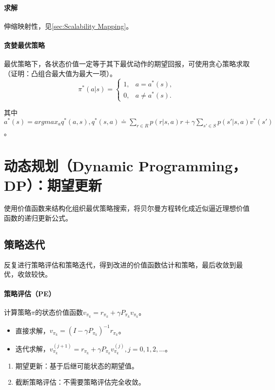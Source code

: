 \documentclass[
12pt, %
a4paper, 
oneside, %
headinclude,footinclude, %
]{scrartcl}
\begin{document}
\paragraph{求解}
伸缩映射性，见\ref{sec:Scalability Mapping}。\label{sec:Scalability Mapping back}
\paragraph{贪婪最优策略}
最优策略下，各状态价值一定等于其下最优动作的期望回报，可使用贪心策略求取（证明：凸组合最大值为最大一项）。
$$
\pi^*(a|s) = 
\begin{cases}
1, & a = a^*(s), \\
0, & a \neq a^*(s).
\end{cases}
$$

其中$ a^*(s) = argmax_a q^*(a, s), q^*(s, a) \doteq \sum_{r \in R} p(r|s, a) r + \gamma \sum_{s' \in S} p(s'|s, a) v^*(s') $。
\section{动态规划（Dynamic Programming，DP）：期望更新}
使用价值函数来结构化组织最优策略搜索，将贝尔曼方程转化成近似逼近理想价值函数的递归更新公式。
\subsection{策略迭代}
反复进行策略评估和策略迭代，得到改进的价值函数估计和策略，最后收敛到最优，收敛较快。
\paragraph{策略评估（PE）}
计算策略$ \pi $的状态价值函数$ v_{\pi_k} = r_{\pi_k} + \gamma P_{\pi_k}v_{\pi_k} $。
\begin{itemize}
\item 直接求解，$ v_{\pi_k} = (I - \gamma P_{\pi_k})^{-1} r_{\pi_k} $。
\item 迭代求解，$ v_{\pi_k}^{(j + 1)} = r_{\pi_k} + \gamma P_{\pi_k} v_{\pi_k}^{(j)}, j = 0, 1, 2, \dots $。
\end{itemize}
\begin{enumerate}
\item 期望更新：基于后继可能状态的期望值。
\item 截断策略评估：不需要策略评估完全收敛。
\end{enumerate}
\end{document}
